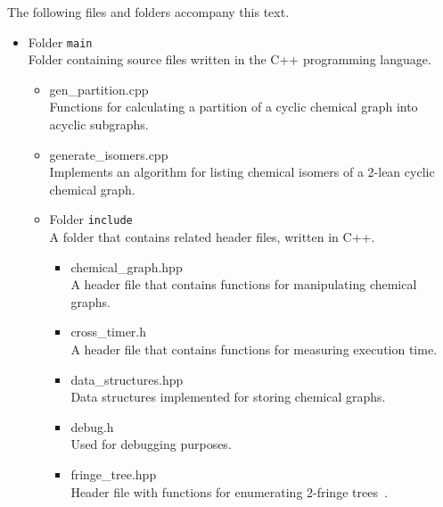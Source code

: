 \documentclass[11pt,titlepage,dvipdfmx,twoside]{article}
\begin{document}
The following files and folders accompany this text.
%
\begin{itemize}		
    \item Folder {\tt main}\\
	    Folder containing source files written in the C++ programming language.
	    \begin{itemize}
		    \item{gen\_partition.cpp}\\
			    Functions for calculating a partition of a cyclic chemical graph into
			    acyclic subgraphs.
			    
		    \item{generate\_isomers.cpp}\\
			    Implements an algorithm for listing chemical isomers of
			    a 2-lean cyclic chemical graph.

	\item Folder {\tt include}\\
		A folder that contains related header files, written in C++.
		\begin{itemize}
			\item{chemical\_graph.hpp}\\
			  A header file that contains functions for manipulating 
			  chemical graphs.
			\item{cross\_timer.h}\\
				A header file that contains functions for measuring execution time.
				
			\item{data\_structures.hpp}\\
				Data structures implemented for storing chemical graphs.
				
			\item{debug.h}\\
				Used for debugging purposes.
				
			\item{fringe\_tree.hpp}\\
				Header file with functions for enumerating 2-fringe trees~\cite{branch}.
				

\end{itemize}
\end{itemize}
\end{itemize}
\end{document}
